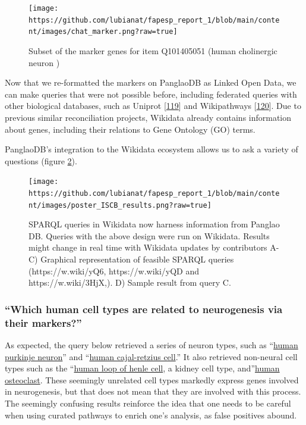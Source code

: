 \begin{figure}
\hypertarget{fig:chat_marker}{%
\centering
\texttt{[image: https://github.com/lubianat/fapesp\_report\_1/blob/main/content/images/chat\_marker.png?raw=true]}
\caption{Subset of the marker genes for item Q101405051 (human cholinergic neuron )}\label{fig:chat_marker}
}
\end{figure}

Now that we re-formatted the markers on PanglaoDB as Linked Open Data, we can make queries that were not possible before, including
federated queries with other biological databases, such as Uniprot {[}\protect\hyperlink{ref-HUJ9NzAb}{119}{]}
and Wikipathways {[}\protect\hyperlink{ref-AgOOCR24}{120}{]}.
Due to previous similar reconciliation projects, Wikidata already contains information about genes, including their relations to Gene Ontology (GO) terms.

PanglaoDB's integration to the Wikidata ecosystem allows us to ask a variety of questions (figure \ref{fig:iscb_results}).

\begin{figure}
\hypertarget{fig:iscb_results}{%
\centering
\texttt{[image: https://github.com/lubianat/fapesp\_report\_1/blob/main/content/images/poster\_ISCB\_results.png?raw=true]}
\caption{SPARQL queries in Wikidata now harness information from Panglao DB. Queries with the above design were run on Wikidata. Results might change in real time with Wikidata updates by contributors A-C) Graphical representation of feasible SPARQL queries (https://w.wiki/yQ6, https://w.wiki/yQD and https://w.wiki/3HjX,). D) Sample result from query C.}\label{fig:iscb_results}
}
\end{figure}

\hypertarget{which-human-cell-types-are-related-to-neurogenesis-via-their-markers}{%
\subsubsection{``Which human cell types are related to neurogenesis via their markers?''}\label{which-human-cell-types-are-related-to-neurogenesis-via-their-markers}}

As expected, the query below retrieved a series of neuron types, such as ``\href{https://www.wikidata.org/wiki/Q101404913}{human purkinje neuron}'' and ``\href{https://www.wikidata.org/wiki/Q101405091}{human cajal-retzius cell}.'' It also retrieved non-neural cell types such as the ``\href{https://www.wikidata.org/wiki/Q101405109}{human loop of henle cell}, a kidney cell type, and''\href{https://www.wikidata.org/wiki/Q101404928}{human osteoclast}. These seemingly unrelated cell types markedly express genes involved in neurogenesis, but that does not mean that they are involved with this process. The seemingly confusing results reinforce the idea that one needs to be careful when using curated pathways to enrich one's analysis, as false positives abound.

